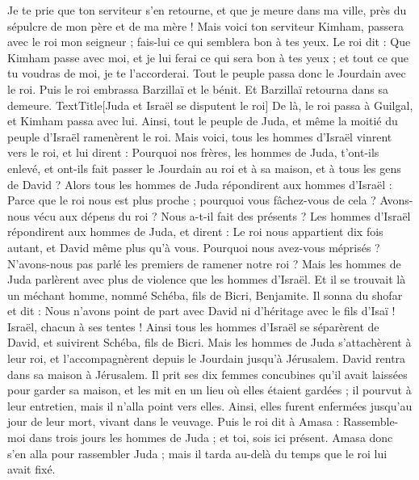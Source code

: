 \begin{multicols}{2}
Je te prie que ton serviteur s'en retourne, et que je meure dans ma ville, près du sépulcre de mon père et de ma mère ! Mais voici ton serviteur Kimham, passera avec le roi mon seigneur ; fais-lui ce qui semblera bon à tes yeux.
Le roi dit : Que Kimham passe avec moi, et je lui ferai ce qui sera bon à tes yeux ; et tout ce que tu voudras de moi, je te l'accorderai.
Tout le peuple passa donc le Jourdain avec le roi. Puis le roi embrassa Barzillaï et le bénit. Et Barzillaï retourna dans sa demeure.
TextTitle{[Juda et Israël se disputent le roi]}
De là, le roi passa à Guilgal, et Kimham passa avec lui. Ainsi, tout le peuple de Juda, et même la moitié du peuple d'Israël ramenèrent le roi.
Mais voici, tous les hommes d'Israël vinrent vers le roi, et lui dirent : Pourquoi nos frères, les hommes de Juda, t'ont-ils enlevé, et ont-ils fait passer le Jourdain au roi et à sa maison, et à tous les gens de David ?
Alors tous les hommes de Juda répondirent aux hommes d'Israël : Parce que le roi nous est plus proche ; pourquoi vous fâchez-vous de cela ? Avons-nous vécu aux dépens du roi ? Nous a-t-il fait des présents ?
Les hommes d'Israël répondirent aux hommes de Juda, et dirent : Le roi nous appartient dix fois autant, et David même plus qu'à vous. Pourquoi nous avez-vous méprisés ? N'avons-nous pas parlé les premiers de ramener notre roi ? Mais les hommes de Juda parlèrent avec plus de violence que les hommes d'Israël.
\VerseOne{}Et il se trouvait là un méchant homme, nommé Schéba, fils de Bicri, Benjamite. Il sonna du shofar et dit : Nous n'avons point de part avec David ni d'héritage avec le fils d'Isaï ! Israël, chacun à ses tentes !
Ainsi tous les hommes d'Israël se séparèrent de David, et suivirent Schéba, fils de Bicri. Mais les hommes de Juda s'attachèrent à leur roi, et l'accompagnèrent depuis le Jourdain jusqu'à Jérusalem.
David rentra dans sa maison à Jérusalem. Il prit ses dix femmes concubines qu'il avait laissées pour garder sa maison, et les mit en un lieu où elles étaient gardées ; il pourvut à leur entretien, mais il n'alla point vers elles. Ainsi, elles furent enfermées jusqu'au jour de leur mort, vivant dans le veuvage.
Puis le roi dit à Amasa : Rassemble-moi dans trois jours les hommes de Juda ; et toi, sois ici présent.
Amasa donc s'en alla pour rassembler Juda ; mais il tarda au-delà du temps que le roi lui avait fixé.

\end{multicols}
